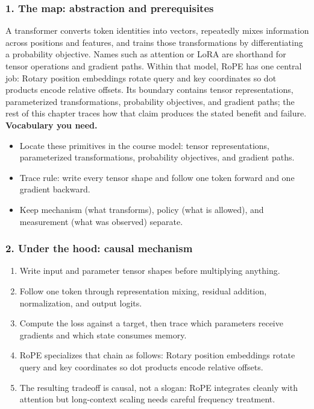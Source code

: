 \subsubsection*{1. The map: abstraction and prerequisites}
A transformer converts token identities into vectors, repeatedly mixes information across positions and features, and trains those transformations by differentiating a probability objective. Names such as attention or LoRA are shorthand for tensor operations and gradient paths.
Within that model, RoPE has one central job: Rotary position embeddings rotate query and key coordinates so dot products encode relative offsets. Its boundary contains tensor representations, parameterized transformations, probability objectives, and gradient paths; the rest of this chapter traces how that claim produces the stated benefit and failure.
\textbf{Vocabulary you need.}\begin{itemize}
\item Locate these primitives in the course model: tensor representations, parameterized transformations, probability objectives, and gradient paths.
\item Trace rule: write every tensor shape and follow one token forward and one gradient backward.
\item Keep mechanism (what transforms), policy (what is allowed), and measurement (what was observed) separate.
\end{itemize}
\subsubsection*{2. Under the hood: causal mechanism}\begin{enumerate}
\item Write input and parameter tensor shapes before multiplying anything.
\item Follow one token through representation mixing, residual addition, normalization, and output logits.
\item Compute the loss against a target, then trace which parameters receive gradients and which state consumes memory.
\item RoPE specializes that chain as follows: Rotary position embeddings rotate query and key coordinates so dot products encode relative offsets.
\item The resulting tradeoff is causal, not a slogan: RoPE integrates cleanly with attention but long-context scaling needs careful frequency treatment.
\end{enumerate}
